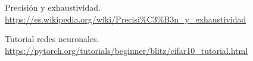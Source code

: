 \documentclass[a4paper, 11pt]{article}
\begin{document}
\begin{thebibliography}{9}


    
    Precisión y exhaustividad. 
    \url{https://es.wikipedia.org/wiki/Precisi%C3%B3n_y_exhaustividad}

    Tutorial redes neuronales.
    \url{https://pytorch.org/tutorials/beginner/blitz/cifar10_tutorial.html}


\end{thebibliography}
      
\end{document}
